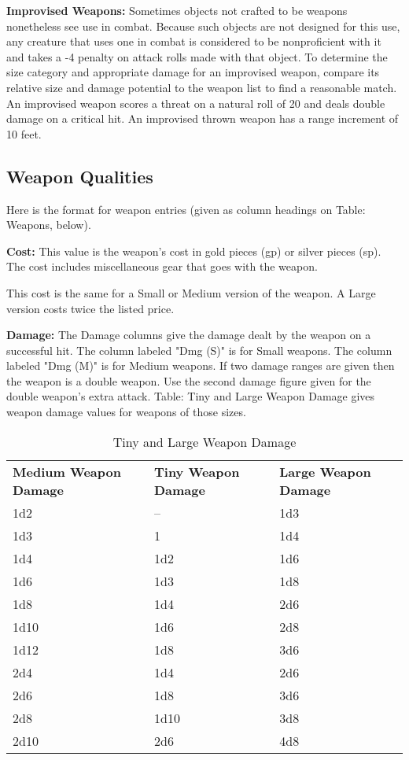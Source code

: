 \vspace{12pt}
\textbf{Improvised Weapons:} Sometimes objects not crafted to be weapons nonetheless 
see use in combat. Because such objects are not designed for this use, any creature 
that uses one in combat is considered to be nonproficient with it and takes a -4 
penalty on attack rolls made with that object. To determine the size category and 
appropriate damage for an improvised weapon, compare its relative size and damage 
potential to the weapon list to find a reasonable match. An improvised weapon scores 
a threat on a natural roll of 20 and deals double damage on a critical hit. An 
improvised thrown weapon has a range increment of 10 feet.

\subsection{Weapon Qualities}

Here is the format for weapon entries (given as column headings on Table: Weapons, 
below).

\textbf{Cost:} This value is the weapon's cost in gold pieces (gp) or silver pieces 
(sp). The cost includes miscellaneous gear that goes with the weapon.

This cost is the same for a Small or Medium version of the weapon. A Large version 
costs twice the listed price.

\textbf{Damage:} The Damage columns give the damage dealt by the weapon on a successful 
hit. The column labeled "Dmg (S)" is for Small weapons. The column labeled "Dmg 
(M)" is for Medium weapons. If two damage ranges are given then the weapon is 
a double weapon. Use the second damage figure given for the double weapon's extra 
attack. Table: Tiny and Large Weapon Damage gives weapon damage values for weapons 
of those sizes.

\begin{table}[htb]
\caption{Tiny and Large Weapon Damage}
\centering
\begin{tabular}{p{1.5cm} p{1.5cm} p{1.5cm}}
\textbf{Medium Weapon Damage} & \textbf{Tiny Weapon Damage} & \textbf{Large Weapon Damage} \\
1d2 & -- & 1d3\\
1d3 & 1 & 1d4\\
1d4 & 1d2 & 1d6\\
1d6 & 1d3 & 1d8\\
1d8 & 1d4 & 2d6\\
1d10 & 1d6 & 2d8\\
1d12 & 1d8 & 3d6\\
2d4 & 1d4 & 2d6\\
2d6 & 1d8 & 3d6\\
2d8 & 1d10 & 3d8\\
2d10 & 2d6 & 4d8\\
\end{tabular}
\end{table}

